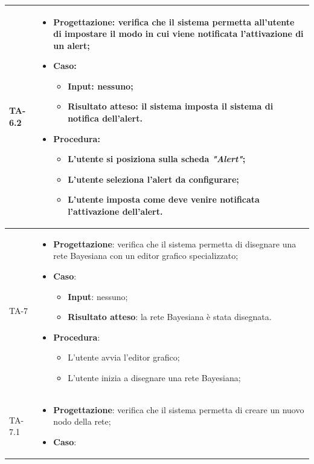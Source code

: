 \begin{longtable}{|C{2.5cm}|C{13cm}|}
\hline
{TA-6.2} &
\begin{itemize}
	\item \textbf{Progettazione}: verifica che il sistema permetta all'utente di impostare il modo in cui viene notificata l'attivazione di un alert;
	\item \textbf{Caso}: 
	\begin{itemize}
		\item \textbf{Input}: nessuno;
		\item \textbf{Risultato atteso}: il sistema imposta il sistema di notifica dell'alert.
	\end{itemize}
	\item \textbf{Procedura}:
	\begin{itemize}
		\item L'utente si posiziona sulla scheda \emph{"Alert"};
		\item L'utente seleziona l'alert da configurare;
		\item L'utente imposta come deve venire notificata l'attivazione dell'alert. 
	\end{itemize} 
\end{itemize} \\
\hline
{TA-7} &
\begin{itemize}
	\item \textbf{Progettazione}: verifica che il sistema permetta di disegnare una rete Bayesiana con un editor grafico specializzato;
	\item \textbf{Caso}: 
	\begin{itemize}
		\item \textbf{Input}: nessuno;
		\item \textbf{Risultato atteso}: la rete Bayesiana è stata disegnata.
	\end{itemize}
	\item \textbf{Procedura}:
	\begin{itemize}
		\item L'utente avvia l'editor grafico;
		\item L'utente inizia a disegnare una rete Bayesiana;
	\end{itemize} 
\end{itemize} \\
\hline
{TA-7.1} &
\begin{itemize}
	\item \textbf{Progettazione}: verifica che il sistema permetta di creare un nuovo nodo della rete;
	\item \textbf{Caso}: 
	\begin{itemize}

\end{itemize}
\end{itemize}
\end{longtable}
